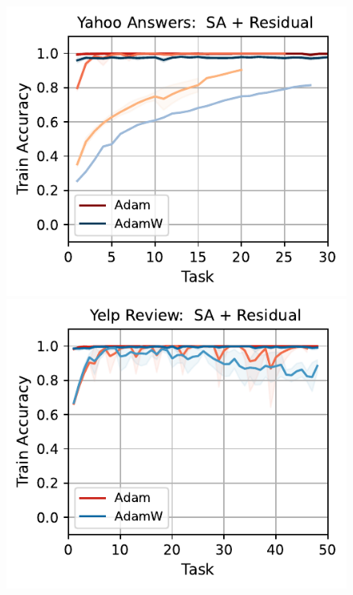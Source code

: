 \begin{figure}[t]
{        \includegraphics[width=\textwidth]{figs/Accuracy/nlp/attention_residual/yahoo_answers_40.pdf}
        \includegraphics[width=\textwidth]{figs/Accuracy/nlp/attention_residual/yelp_review_full_40.pdf}
    }
    \\
    \resizebox{\textwidth}{!}{
}
\end{figure}
